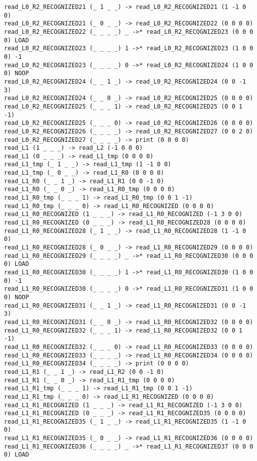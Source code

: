 \documentclass[english,shortabstract,mgr]{iithesis}
\begin{document}
\begin{verbatim}
read_L0_R2_RECOGNIZED21 (_ 1 _ _) -> read_L0_R2_RECOGNIZED21 (1 -1 0 0)
read_L0_R2_RECOGNIZED21 (_ 0 _ _) -> read_L0_R2_RECOGNIZED22 (0 0 0 0)
read_L0_R2_RECOGNIZED22 (_ _ _ _) _ ->* read_L0_R2_RECOGNIZED23 (0 0 0 0) LOAD
read_L0_R2_RECOGNIZED23 (_ _ _ _) 1 ->* read_L0_R2_RECOGNIZED23 (1 0 0 0) -1
read_L0_R2_RECOGNIZED23 (_ _ _ _) 0 ->* read_L0_R2_RECOGNIZED24 (1 0 0 0) NOOP
read_L0_R2_RECOGNIZED24 (_ _ 1 _) -> read_L0_R2_RECOGNIZED24 (0 0 -1 3)
read_L0_R2_RECOGNIZED24 (_ _ 0 _) -> read_L0_R2_RECOGNIZED25 (0 0 0 0)
read_L0_R2_RECOGNIZED25 (_ _ _ 1) -> read_L0_R2_RECOGNIZED25 (0 0 1 -1)
read_L0_R2_RECOGNIZED25 (_ _ _ 0) -> read_L0_R2_RECOGNIZED26 (0 0 0 0)
read_L0_R2_RECOGNIZED26 (_ _ _ _) -> read_L0_R2_RECOGNIZED27 (0 0 2 0)
read_L0_R2_RECOGNIZED27 (_ _ _ _) -> print (0 0 0 0)
read_L1 (1 _ _ _) -> read_L2 (-1 0 0 0)
read_L1 (0 _ _ _) -> read_L1_tmp (0 0 0 0)
read_L1_tmp (_ 1 _ _) -> read_L1_tmp (1 -1 0 0)
read_L1_tmp (_ 0 _ _) -> read_L1_R0 (0 0 0 0)
read_L1_R0 (_ _ 1 _) -> read_L1_R1 (0 0 -1 0)
read_L1_R0 (_ _ 0 _) -> read_L1_R0_tmp (0 0 0 0)
read_L1_R0_tmp (_ _ _ 1) -> read_L1_R0_tmp (0 0 1 -1)
read_L1_R0_tmp (_ _ _ 0) -> read_L1_R0_RECOGNIZED (0 0 0 0)
read_L1_R0_RECOGNIZED (1 _ _ _) -> read_L1_R0_RECOGNIZED (-1 3 0 0)
read_L1_R0_RECOGNIZED (0 _ _ _) -> read_L1_R0_RECOGNIZED28 (0 0 0 0)
read_L1_R0_RECOGNIZED28 (_ 1 _ _) -> read_L1_R0_RECOGNIZED28 (1 -1 0 0)
read_L1_R0_RECOGNIZED28 (_ 0 _ _) -> read_L1_R0_RECOGNIZED29 (0 0 0 0)
read_L1_R0_RECOGNIZED29 (_ _ _ _) _ ->* read_L1_R0_RECOGNIZED30 (0 0 0 0) LOAD
read_L1_R0_RECOGNIZED30 (_ _ _ _) 1 ->* read_L1_R0_RECOGNIZED30 (1 0 0 0) -1
read_L1_R0_RECOGNIZED30 (_ _ _ _) 0 ->* read_L1_R0_RECOGNIZED31 (1 0 0 0) NOOP
read_L1_R0_RECOGNIZED31 (_ _ 1 _) -> read_L1_R0_RECOGNIZED31 (0 0 -1 3)
read_L1_R0_RECOGNIZED31 (_ _ 0 _) -> read_L1_R0_RECOGNIZED32 (0 0 0 0)
read_L1_R0_RECOGNIZED32 (_ _ _ 1) -> read_L1_R0_RECOGNIZED32 (0 0 1 -1)
read_L1_R0_RECOGNIZED32 (_ _ _ 0) -> read_L1_R0_RECOGNIZED33 (0 0 0 0)
read_L1_R0_RECOGNIZED33 (_ _ _ _) -> read_L1_R0_RECOGNIZED34 (0 0 0 0)
read_L1_R0_RECOGNIZED34 (_ _ _ _) -> print (0 0 0 0)
read_L1_R1 (_ _ 1 _) -> read_L1_R2 (0 0 -1 0)
read_L1_R1 (_ _ 0 _) -> read_L1_R1_tmp (0 0 0 0)
read_L1_R1_tmp (_ _ _ 1) -> read_L1_R1_tmp (0 0 1 -1)
read_L1_R1_tmp (_ _ _ 0) -> read_L1_R1_RECOGNIZED (0 0 0 0)
read_L1_R1_RECOGNIZED (1 _ _ _) -> read_L1_R1_RECOGNIZED (-1 3 0 0)
read_L1_R1_RECOGNIZED (0 _ _ _) -> read_L1_R1_RECOGNIZED35 (0 0 0 0)
read_L1_R1_RECOGNIZED35 (_ 1 _ _) -> read_L1_R1_RECOGNIZED35 (1 -1 0 0)
read_L1_R1_RECOGNIZED35 (_ 0 _ _) -> read_L1_R1_RECOGNIZED36 (0 0 0 0)
read_L1_R1_RECOGNIZED36 (_ _ _ _) _ ->* read_L1_R1_RECOGNIZED37 (0 0 0 0) LOAD

\end{verbatim}
\end{document}
